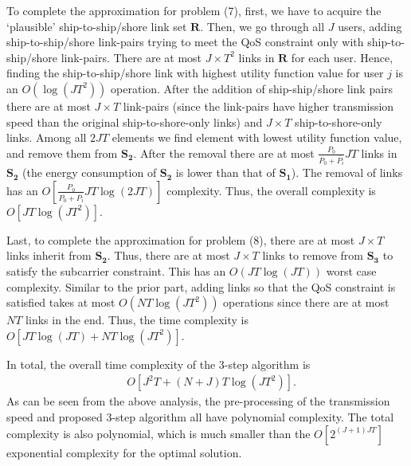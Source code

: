 \documentclass[journal]{IEEEtran}
\begin{document}
   To complete the approximation for problem (7), first, we have to acquire the `plausible' ship-to-ship/shore link set ${\mathbf{R}}$. %
   Then, we go through all $J$ users, adding ship-to-ship/shore link-pairs trying to meet the QoS constraint only with ship-to-ship/shore link-pairs. There are at most $J \times T^2$ links in ${\mathbf{R}}$ for each user. Hence, finding the ship-to-ship/shore link with highest utility function value for user $j$ is an $O\left( \log \left( JT^2 \right) \right)$ operation. 
   After the addition of ship-ship/shore link pairs there are at most $J \times T$ link-pairs (since the link-pairs have higher transmission speed than the original ship-to-shore-only links) and 
   $J \times T$ ship-to-shore-only links. 
   Among all ${2J}T$ elements we find element with lowest utility function value, and remove them from ${{\mathbf{S}}_{\mathbf{2}}}$. After the removal there are at most $\frac{{{P_0}}}{{{P_0} + \overline {{P_i}} }} { J} T$ links in ${{\mathbf{S}}_{\mathbf{2}}}$ (the energy consumption of ${{\mathbf{S}}_{\mathbf{2}}}$ is lower than that of ${{\mathbf{S}}_{\mathbf{1}}}$). 
   The removal of links has an $O\left[ \frac{{{P_0}}}{{{P_0} + \overline {{P_i}} }} { J} T \log \left( { {2J} T} \right)  \right]$ complexity. 
   Thus, the overall complexity is $O\left[ {JT \log \left( JT^2 \right)} \right]$. 
  
   Last, to complete the approximation for problem (8), there are at most $ J \times T$  links inherit from ${{\mathbf{S}}_{\mathbf{2}}}$. Thus, there are at most $J \times T$ links to remove from ${{\mathbf{S}}_{\mathbf{3}}}$ to satisfy the subcarrier constraint. This has an $O\left( JT\log \left( JT \right) \right)$ worst case complexity. Similar to the prior part, adding links so that the QoS constraint is satisfied takes at most $O\left( NT\log \left( JT^2 \right) \right)$ operations since there are at most $NT$ links in the end. Thus, the time complexity is $O\left[ JT \log \left( JT \right) + NT \log \left( {JT^2} \right) \right]$.
  
   In total, the overall time complexity of the 3-step algorithm is 
   \begin{align}
    &  O\left[  J^2 T  + { \left({N+J}\right) T \log \left( JT^2 \right)} \right].
   \end{align}
   As can be seen from the above analysis, the pre-processing of the transmission speed and proposed 3-step algorithm all have polynomial complexity. The total complexity is also polynomial, which is much smaller than the $O\left[ 2^{\left( J+1 \right)JT} \right]$ exponential complexity for the optimal solution. 
   
\end{document}
